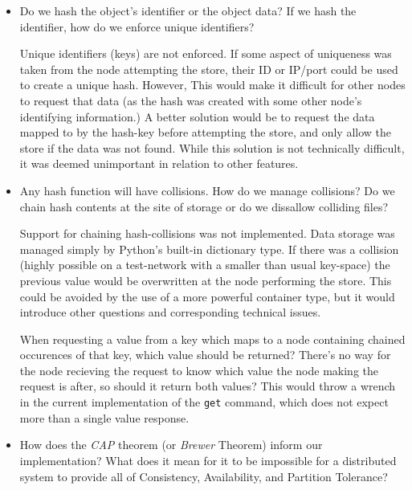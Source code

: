 \documentclass[12pt]{report}
\newcommand{\code}[1]{\colorbox{codegray}{\texttt{#1}}}
\begin{document}
\begin{itemize}
        \item Do we hash the object's identifier or the object data?  If we hash
            the identifier, how do we enforce unique identifiers?

            Unique identifiers (keys) are not enforced.  If some aspect of
            uniqueness was taken from the node attempting the store, their ID
            or IP/port could be used to create a unique hash. However, This would
            make it difficult for other nodes to request that data (as the hash
            was created with some other node's identifying information.)  A
            better solution would be to request the data mapped to by the
            hash-key before attempting the store, and only allow the store if
            the data was not found.  While this solution is not technically
            difficult, it was deemed unimportant in relation to other features.

        \item Any hash function will have collisions.  How do we manage
            collisions?  Do we chain hash contents at the site of storage or do
            we dissallow colliding files?

            Support for chaining hash-collisions was not implemented.  Data
            storage was managed simply by Python's built-in dictionary type.
            If there was a collision (highly possible on a test-network with a
            smaller than usual key-space) the previous value would be
            overwritten at the node performing the store.  This could be
            avoided by the use of a more powerful container type, but it would
            introduce other questions and corresponding technical issues.

            When requesting a value from a key which maps to a node containing
            chained occurences of that key, which value should be returned?
            There's no way for the node recieving the request to know which
            value the node making the request is after, so should it return
            both values?  This would throw a wrench in the current
            implementation of the \code{get} command, which does not expect
            more than a single value response.

        \item How does the \textit{CAP} theorem (or \textit{Brewer} Theorem)
            inform our implementation? What does it mean for it to be impossible
            for a distributed system to provide all of Consistency,
            Availability, and Partition Tolerance?


\end{itemize}
\end{document}
